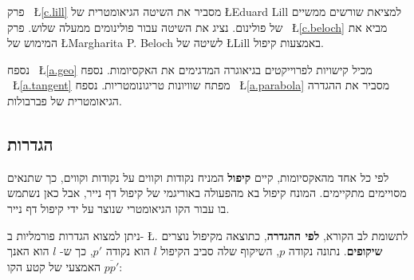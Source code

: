 פרק%
~\L{\ref{c.lill}}
מסביר את השיטה הגיאומטרית של 
\L{Eduard Lill}
למציאת שורשים ממשיים של פולינום. נציג את השיטה עבור פולינומים ממעלה שלוש. פרק%
~\L{\ref{c.beloch}}
מביא את המימוש של
\L{Margharita P. Beloch}
לשיטה של 
\L{Lill}
באמצעות קיפול.

נספח%
~\L{\ref{a.geo}}
מכיל קישויות לפרוייקטים בגיאוגרה המדגימים את האקסיומות. נספח%
~\L{\ref{a.tangent}}
מפתח שוויונות טריגונומטריות. נספח%
~\L{\ref{a.parabola}}
מסביר את ההגדרה הגיאומטרית של פברבולות.

\subsection*{הגדרות}

לפי כל אחד מהאקסיומות, קיים
\textbf{קיפול}
המניח נקודות וקווים על נקודות וקווים, כך שתנאים מסויימים מתקיימים. המונח קיפול בא מהפעולה באוריגמי של קיפול דף נייר, אבל כאן נשתמש בו עבור הקו הגיאומטרי שנוצר על ידי קיפול דף נייר.

ניתן למצוא הגדרות פורמליות ב-%
\L{\cite[10~]{martin}}.
לתשומת לב הקורא, 
\textbf{לפי ההגדרה},
כתוצאה מקיפול נוצרים 
\textbf{שיקופים}.
נתונה נקודה 
$p$,
השיקוף שלה סביב הקיפול 
$l$
הוא נקודה
$p'$,
כך ש-%
$l$
הוא האנך האמצעי של קטע הקו
$\overline{pp'}$:

\begin{center}
\end{center}
